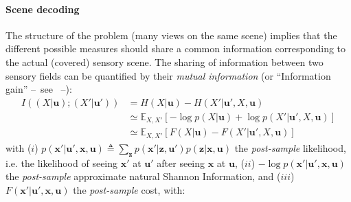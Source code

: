 \documentclass[12pt,twoside,openright]{article}
\begin{document}
\paragraph{Scene decoding}
The structure of the problem (many views on the same scene) implies that the different possible measures should share a common information corresponding to the actual (covered) sensory scene. The sharing of information between two sensory fields can be quantified by their \emph{mutual information} (or ``Information gain'' --~see \cite{tishby2011information}~--):
\begin{align}
I((X| \boldsymbol{u}); (X'| \boldsymbol{u}')) &= H(X| \boldsymbol{u}) - H(X'| \boldsymbol{u}', X, \boldsymbol{u})\\
&\simeq \mathbb{E}_{X,X'} \left[-\log p(X| \boldsymbol{u}) + \log p(X'| \boldsymbol{u}', X, \boldsymbol{u})\right] \nonumber\\
&\simeq \mathbb{E}_{X,X'} \left[F(X|\boldsymbol{u}) - F(X'|\boldsymbol{u}', X, \boldsymbol{u})\right] \label{eq:infomax}
\end{align}
with 
($i$) $ p(\boldsymbol{x}'| \boldsymbol{u}', \boldsymbol{x}, \boldsymbol{u}) \triangleq \sum_{\boldsymbol{z}} p(\boldsymbol{x}'|\boldsymbol{z}, \boldsymbol{u}') p(\boldsymbol{z}|\boldsymbol{x}, \boldsymbol{u})$ 
	the \emph{post-sample} likelihood, i.e. the likelihood of seeing $\boldsymbol{x}'$ at $\boldsymbol{u}'$ after seeing $\boldsymbol{x}$ at $\boldsymbol{u}$,
($ii$) $-\log p(\boldsymbol{x}'| \boldsymbol{u}', \boldsymbol{x}, \boldsymbol{u})$
the \emph{post-sample} approximate natural Shannon Information, and ($iii$) $F(\boldsymbol{x}'|\boldsymbol{u}', \boldsymbol{x}, \boldsymbol{u})$
the \emph{post-sample} cost, 
with: %
\end{document}
